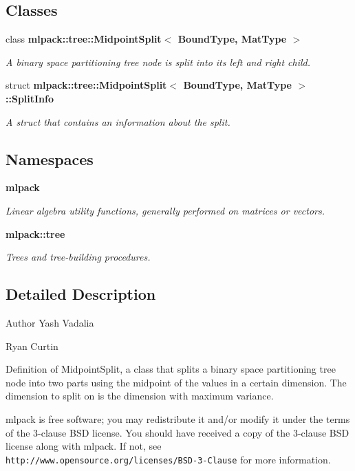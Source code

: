 \subsection*{Classes}
\begin{DoxyCompactItemize}
\item 
class {\bf mlpack\+::tree\+::\+Midpoint\+Split$<$ Bound\+Type, Mat\+Type $>$}
\begin{DoxyCompactList}\small\item\em A binary space partitioning tree node is split into its left and right child. \end{DoxyCompactList}\item 
struct {\bf mlpack\+::tree\+::\+Midpoint\+Split$<$ Bound\+Type, Mat\+Type $>$\+::\+Split\+Info}
\begin{DoxyCompactList}\small\item\em A struct that contains an information about the split. \end{DoxyCompactList}\end{DoxyCompactItemize}
\subsection*{Namespaces}
\begin{DoxyCompactItemize}
\item 
 {\bf mlpack}
\begin{DoxyCompactList}\small\item\em Linear algebra utility functions, generally performed on matrices or vectors. \end{DoxyCompactList}\item 
 {\bf mlpack\+::tree}
\begin{DoxyCompactList}\small\item\em Trees and tree-\/building procedures. \end{DoxyCompactList}\end{DoxyCompactItemize}


\subsection{Detailed Description}
\begin{DoxyAuthor}{Author}
Yash Vadalia 

Ryan Curtin
\end{DoxyAuthor}
Definition of Midpoint\+Split, a class that splits a binary space partitioning tree node into two parts using the midpoint of the values in a certain dimension. The dimension to split on is the dimension with maximum variance.

mlpack is free software; you may redistribute it and/or modify it under the terms of the 3-\/clause B\+SD license. You should have received a copy of the 3-\/clause B\+SD license along with mlpack. If not, see {\tt http\+://www.\+opensource.\+org/licenses/\+B\+S\+D-\/3-\/\+Clause} for more information. 
